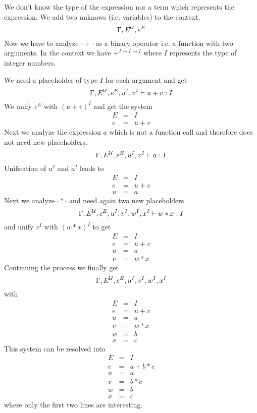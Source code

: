 We don't know the type of the expression nor a term which
represents the expression. We add two unknows (i.e. variables) to the context.
%
$$
\Gamma, E^{\cal{U}}, e^E
$$
%
Now we have to analyze $\cdot + \cdot$ as a binary operator i.e. a function
with two arguments. In the context we have $+^{I \to I \to I}$ where $I$
represents the type of integer numbers.

We need a placeholder of type $I$ for each argument and get
$$
%
\Gamma,  E^\Any, e^E, u^I, v^I \vdash u + v: I
$$
%
We unify $e^E$ with $(u+v)^I$ and get the system
$$
%
\begin{array}{lll}
  E &=& I
  \\
  e &=& u + v
\end{array}
$$
%
Next we analyze the expression $a$ which is not a function call and therefore
does not need new placeholders.
$$
%
\Gamma,  E^\Any, e^E, u^I, v^I \vdash a:I
$$
%
Unification of $u^I$ and $a^I$ leads to
$$
%
\begin{array}{lll}
  E &=& I
  \\
  e &=& u + v
  \\
  u &=& a
\end{array}
$$
%
Next we analyze $\cdot * \cdot$ and need again two new placeholders
$$
%
\Gamma,  E^\Any, e^E, u^I, v^I, w^I, x^I \vdash w * x: I
$$
%
and unify $v^I$ with $ (w * x)^I$ to get
$$
%
\begin{array}{lll}
  E &=& I
  \\
  e &=& u + v
  \\
  u &=& a
  \\
  v &=& w * x
\end{array}
$$
%
Continuing the process we finally get
$$
%
\Gamma,  E^\Any, e^E, u^I, v^I, w^I, x^I
$$
%
with
$$
%
\begin{array}{lll}
  E &=& I
  \\
  e &=& u + v
  \\
  u &=& a
  \\
  v &=& w * x
  \\
  w &=& b
  \\
  x &=& c
\end{array}
$$
%
This system can be resolved into
$$
%
\begin{array}{lll}
  E &=& I
  \\
  e &=& a + b * c
  \\
  u &=& a
  \\
  v &=& b * c
  \\
  w &=& b
  \\
  x &=& c
\end{array}
$$
%
where only the first two lines are interesting.





